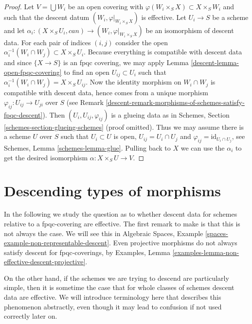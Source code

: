 \begin{proof}

Let $V = \bigcup W_i$ be an open covering with
$\varphi(W_i \times_S X) \subset X \times_S W_i$
and such that the descent datum $(W_i, \varphi|_{W_i \times_S X})$
is effective. Let $U_i \to S$ be a scheme and let
$\alpha_i : (X \times_S U_i, can) \to (W_i, \varphi|_{W_i \times_S X})$
be an isomorphism of descent data. For each pair of indices
$(i, j)$ consider the open
$\alpha_i^{-1}(W_i \cap W_j) \subset X \times_S U_i$.
Because everything is compatible with descent data
and since $\{X \to S\}$ is an fpqc covering, we
may apply Lemma \ref{descent-lemma-open-fpqc-covering}
to find an open $U_{ij} \subset U_i$ such that
$\alpha_i^{-1}(W_i \cap W_j) = X \times_S U_{ij}$.
Now the identity morphism on $W_i \cap W_j$ is
compatible with descent data, hence comes from a
unique morphism $\varphi_{ij} : U_{ij} \to U_{ji}$ over $S$
(see Remark \ref{descent-remark-morphisms-of-schemes-satisfy-fpqc-descent}).
Then $(U_i, U_{ij}, \varphi_{ij})$ is a glueing
data as in Schemes, Section \ref{schemes-section-glueing-schemes}
(proof omitted). Thus we may assume there is a scheme $U$ over $S$
such that $U_i \subset U$ is open, $U_{ij} = U_i \cap U_j$ and
$\varphi_{ij} = \text{id}_{U_i \cap U_j}$, see
Schemes, Lemma \ref{schemes-lemma-glue}.
Pulling back to $X$ we can use the $\alpha_i$ to
get the desired isomorphism $\alpha : X \times_S U \to V$.
\end{proof}

\section{Descending types of morphisms}
\label{descent-section-descending-types-morphisms}
In the following we study the question as to whether
descent data for schemes relative to a fpqc-covering
are effective. The first remark to make is that this
is not always the case. We will see this in Algebraic
Spaces, Example \ref{spaces-example-non-representable-descent}.
Even projective morphisms do not always satisfy descent
for fpqc-coverings, by Examples,
Lemma \ref{examples-lemma-non-effective-descent-projective}.

\medskip\noindent
On the other hand, if the schemes we are trying to
descend are particularly simple, then it is sometime the
case that for whole classes of schemes descent data
are effective. We will introduce terminology here that
describes this phenomenon abstractly, even though it
may lead to confusion if not used correctly later on.

